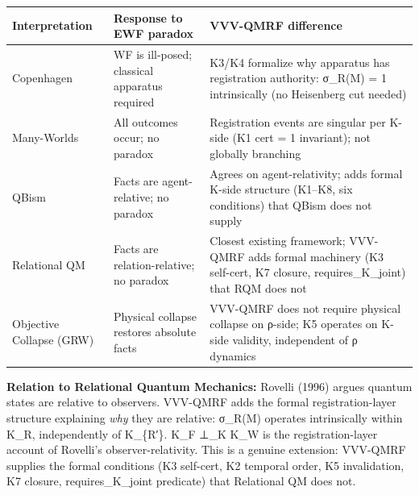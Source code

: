 \documentclass[
  11pt,
]{article}
\newcounter{none} %
\begin{document}
{\def\LTcaptype{none} %
\begin{longtable}[]{@{}
  >{\raggedright\arraybackslash}p{}
  >{\raggedright\arraybackslash}p{}
  >{\raggedright\arraybackslash}p{}@{}}
\toprule\noalign{}
\begin{minipage}[b]{\linewidth}\raggedright
Interpretation
\end{minipage} & \begin{minipage}[b]{\linewidth}\raggedright
Response to EWF paradox
\end{minipage} & \begin{minipage}[b]{\linewidth}\raggedright
VVV-QMRF difference
\end{minipage} \\
\midrule\noalign{}
\endhead
\bottomrule\noalign{}
\endlastfoot
Copenhagen & WF is ill-posed; classical apparatus required & K3/K4
formalize why apparatus has registration authority: σ\_R(M) = 1
intrinsically (no Heisenberg cut needed) \\
Many-Worlds & All outcomes occur; no paradox & Registration events are
singular per K-side (K1 cert = 1 invariant); not globally branching \\
QBism & Facts are agent-relative; no paradox & Agrees on
agent-relativity; adds formal K-side structure (K1--K8, six conditions)
that QBism does not supply \\
Relational QM & Facts are relation-relative; no paradox & Closest
existing framework; VVV-QMRF adds formal machinery (K3 self-cert, K7
closure, requires\_K\_joint) that RQM does not \\
Objective Collapse (GRW) & Physical collapse restores absolute facts &
VVV-QMRF does not require physical collapse on ρ-side; K5 operates on
K-side validity, independent of ρ dynamics \\
\end{longtable}
}

\textbf{Relation to Relational Quantum Mechanics:} Rovelli (1996) argues
quantum states are relative to observers. VVV-QMRF adds the formal
registration-layer structure explaining \emph{why} they are relative:
σ\_R(M) operates intrinsically within K\_R, independently of K\_\{R′\}.
K\_F ⊥\_K K\_W is the registration-layer account of Rovelli's
observer-relativity. This is a genuine extension: VVV-QMRF supplies the
formal conditions (K3 self-cert, K2 temporal order, K5 invalidation, K7
closure, requires\_K\_joint predicate) that Relational QM does not.
\end{document}
